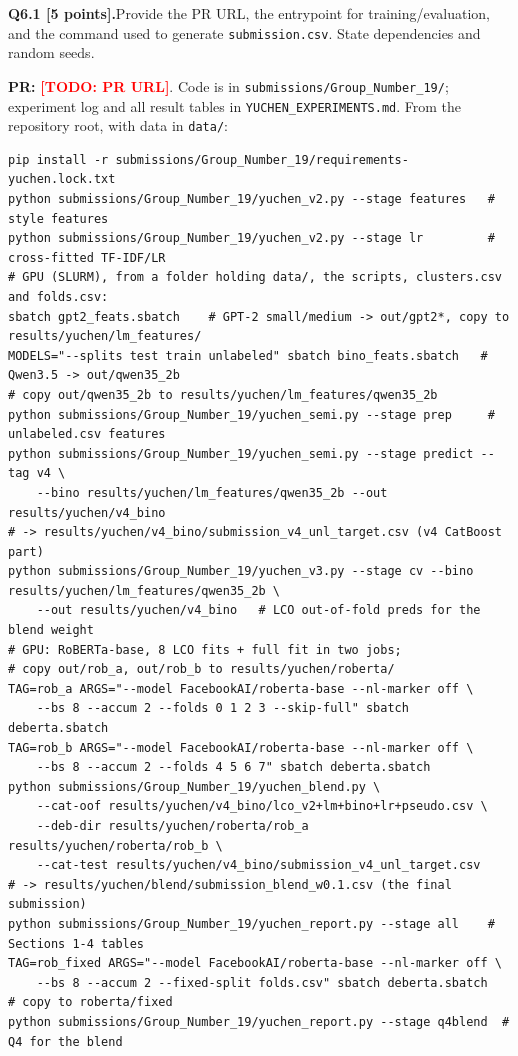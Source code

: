 \documentclass[11pt,letterpaper]{article}
\newcommand{\todo}[1]{\textcolor{red}{\textbf{[TODO: #1]}}}
\newcommand{\question}[2]{\needspace{4\baselineskip}\par\addvspace{0.45em}\noindent\textbf{#1}\quad #2\par\nobreak\vspace{0.1em}}
\begin{document}
\question{Q6.1 [5 points].}{Provide the PR URL, the entrypoint for training/evaluation, and the command used to generate \texttt{submission.csv}. State dependencies and random seeds.}
\textbf{PR:} \todo{PR URL}. Code is in \texttt{submissions/Group\_Number\_19/}; experiment log and all result tables in \texttt{YUCHEN\_EXPERIMENTS.md}. From the repository root, with data in \texttt{data/}:
{\footnotesize\begin{verbatim}
pip install -r submissions/Group_Number_19/requirements-yuchen.lock.txt
python submissions/Group_Number_19/yuchen_v2.py --stage features   # style features
python submissions/Group_Number_19/yuchen_v2.py --stage lr         # cross-fitted TF-IDF/LR
# GPU (SLURM), from a folder holding data/, the scripts, clusters.csv and folds.csv:
sbatch gpt2_feats.sbatch    # GPT-2 small/medium -> out/gpt2*, copy to results/yuchen/lm_features/
MODELS="--splits test train unlabeled" sbatch bino_feats.sbatch   # Qwen3.5 -> out/qwen35_2b
# copy out/qwen35_2b to results/yuchen/lm_features/qwen35_2b
python submissions/Group_Number_19/yuchen_semi.py --stage prep     # unlabeled.csv features
python submissions/Group_Number_19/yuchen_semi.py --stage predict --tag v4 \
    --bino results/yuchen/lm_features/qwen35_2b --out results/yuchen/v4_bino
# -> results/yuchen/v4_bino/submission_v4_unl_target.csv (v4 CatBoost part)
python submissions/Group_Number_19/yuchen_v3.py --stage cv --bino results/yuchen/lm_features/qwen35_2b \
    --out results/yuchen/v4_bino   # LCO out-of-fold preds for the blend weight
# GPU: RoBERTa-base, 8 LCO fits + full fit in two jobs;
# copy out/rob_a, out/rob_b to results/yuchen/roberta/
TAG=rob_a ARGS="--model FacebookAI/roberta-base --nl-marker off \
    --bs 8 --accum 2 --folds 0 1 2 3 --skip-full" sbatch deberta.sbatch
TAG=rob_b ARGS="--model FacebookAI/roberta-base --nl-marker off \
    --bs 8 --accum 2 --folds 4 5 6 7" sbatch deberta.sbatch
python submissions/Group_Number_19/yuchen_blend.py \
    --cat-oof results/yuchen/v4_bino/lco_v2+lm+bino+lr+pseudo.csv \
    --deb-dir results/yuchen/roberta/rob_a results/yuchen/roberta/rob_b \
    --cat-test results/yuchen/v4_bino/submission_v4_unl_target.csv
# -> results/yuchen/blend/submission_blend_w0.1.csv (the final submission)
python submissions/Group_Number_19/yuchen_report.py --stage all    # Sections 1-4 tables
TAG=rob_fixed ARGS="--model FacebookAI/roberta-base --nl-marker off \
    --bs 8 --accum 2 --fixed-split folds.csv" sbatch deberta.sbatch   # copy to roberta/fixed
python submissions/Group_Number_19/yuchen_report.py --stage q4blend  # Q4 for the blend
\end{verbatim}}
\end{document}
